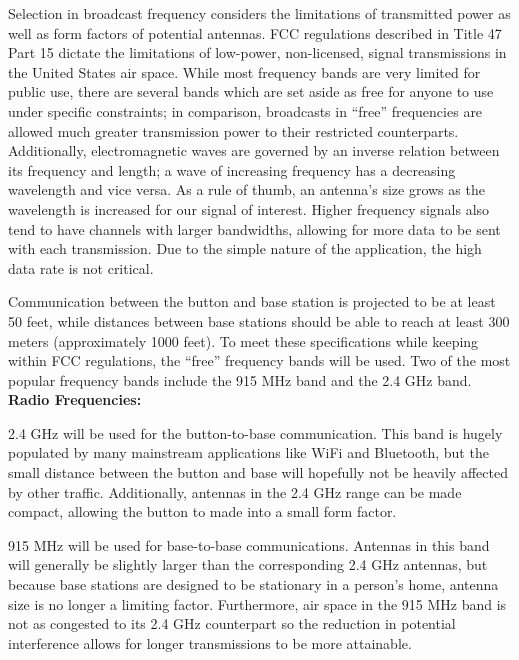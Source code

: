 \documentclass[journal,compsoc]{IEEEtran}
\begin{document}
Selection in broadcast frequency considers the limitations of transmitted power as well as form factors of potential antennas.  FCC regulations described in Title 47 Part 15 dictate the limitations of low-power, non-licensed, signal transmissions in the United States air space.  While most frequency bands are very limited for public use, there are several bands which are set aside as free for anyone to use under specific constraints; in comparison, broadcasts in “free” frequencies are allowed much greater transmission power to their restricted counterparts.  Additionally, electromagnetic waves are governed by an inverse relation between its frequency and length; a wave of increasing frequency has a decreasing wavelength and vice versa.  As a rule of thumb, an antenna’s size grows as the wavelength is increased for our signal of interest. Higher frequency signals also tend to have channels with larger bandwidths, allowing for more data to be sent with each transmission.  Due to the simple nature of the application, the high data rate is not critical.

Communication between the button and base station is projected to be at least 50 feet, while distances between base stations should be able to reach at least 300 meters (approximately 1000 feet).  To meet these specifications while keeping within FCC regulations, the “free” frequency bands will be used. Two of the most popular frequency bands include the 915 MHz band and the 2.4 GHz band.\\

\textbf {Radio Frequencies:}

\begin{LaTeXdescription}
  \item [2.4 GHz] will be used for the button-to-base communication. This band is hugely populated by many mainstream applications like WiFi and Bluetooth, but the small distance between the button and base will hopefully not be heavily affected by other traffic. Additionally, antennas in the 2.4 GHz range can be made compact, allowing the button to made into a small form factor.
  \item[915 MHz] will be used for base-to-base communications.  Antennas in this band will generally be slightly larger than the corresponding 2.4 GHz antennas, but because base stations are designed to be stationary in a person’s home, antenna size is no longer a limiting factor.  Furthermore, air space in the 915 MHz band is not as congested to its 2.4 GHz counterpart so the reduction in potential interference allows for longer transmissions to be more attainable.
\end{LaTeXdescription}
\end{document}
